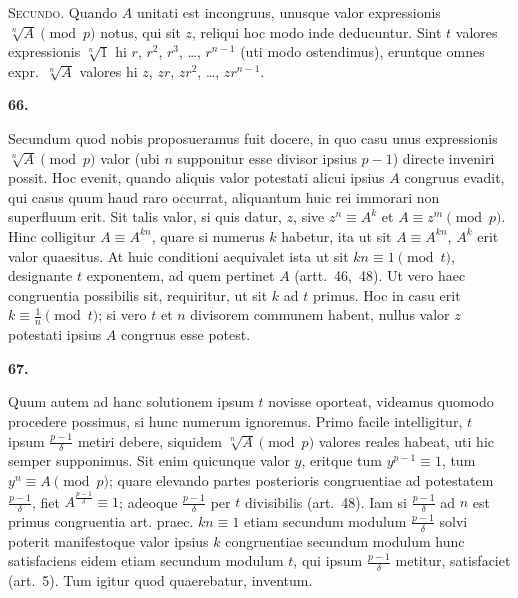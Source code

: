 \documentclass[12pt,a4paper]{article}
\theoremstyle{plain}
\theoremstyle{definition}
\theoremstyle{remark}
\begin{document}
\textsc{Secundo.} Quando $A$ unitati est incongruus, unusque valor expressionis $\sqrt[n]{A} \pmod{p}$ notus, qui sit $z$, reliqui hoc modo inde deducuntur. Sint $t$ valores expressionis $\sqrt[n]{1}$ hi $r$, $r^2$, $r^3$, \ldots, $r^{n-1}$ (uti modo ostendimus), eruntque omnes expr.~$\sqrt[n]{A}$ valores hi $z$, $zr$, $zr^2$, \ldots, $zr^{n-1}$.


\setcounter{satz}{66}
\addtocounter{satz}{-1}
\textbf{66.}

Secundum quod nobis proposueramus fuit docere, in quo casu unus expressionis $\sqrt[n]{A} \pmod{p}$ valor (ubi $n$ supponitur esse divisor ipsius $p-1$) directe inveniri possit. Hoc evenit, quando aliquis valor potestati alicui ipsius $A$ congruus evadit, qui casus quum haud raro occurrat, aliquantum huic rei immorari non superfluum erit. Sit talis valor, si quis datur, $z$, sive $z^n \equiv A^k$ et $A \equiv z^m \pmod{p}$. Hinc colligitur $A \equiv A^{kn}$, quare si numerus $k$ habetur, ita ut sit $A \equiv A^{kn}$, $A^k$ erit valor quaesitus. At huic conditioni aequivalet ista ut sit $kn \equiv 1 \pmod{t}$, designante $t$ exponentem, ad quem pertinet $A$ (artt.~46,~48). Ut vero haec congruentia possibilis sit, requiritur, ut sit $k$ ad $t$ primus. Hoc in casu erit $k \equiv \frac{1}{n} \pmod{t}$; si vero $t$ et $n$ divisorem communem habent, nullus valor $z$ potestati ipsius $A$ congruus esse potest.

\setcounter{satz}{67}
\addtocounter{satz}{-1}
\textbf{67.}

Quum autem ad hanc solutionem ipsum $t$ novisse oporteat, videamus quomodo procedere possimus, si hunc numerum ignoremus. Primo facile intelligitur, $t$ ipsum $\frac{p-1}{\delta}$ metiri debere, siquidem $\sqrt[n]{A} \pmod{p}$ valores reales habeat, uti hic semper supponimus. Sit enim quicunque valor $y$, eritque tum $y^{p-1} \equiv 1$, tum $y^n \equiv A \pmod{p}$; quare elevando partes posterioris congruentiae ad potestatem $\frac{p-1}{\delta}$, fiet $A^{\frac{p-1}{\delta}} \equiv 1$; adeoque $\frac{p-1}{\delta}$ per $t$ divisibilis (art.~48). Iam si $\frac{p-1}{\delta}$ ad $n$ est primus congruentia art. praec. $kn \equiv 1$ etiam secundum modulum $\frac{p-1}{\delta}$ solvi poterit manifestoque valor ipsius $k$ congruentiae secundum modulum hunc satisfaciens eidem etiam secundum modulum $t$, qui ipsum $\frac{p-1}{\delta}$ metitur, satisfaciet (art.~5). Tum igitur quod quaerebatur, inventum.
\end{document}
